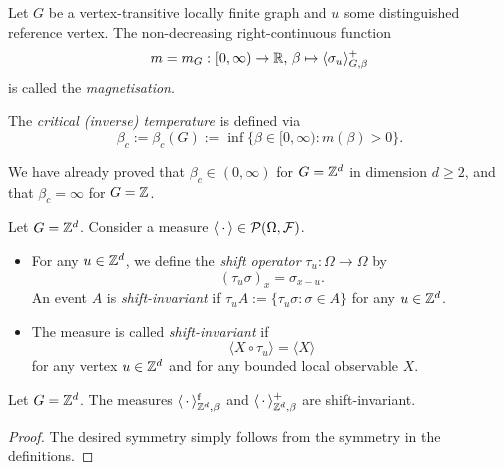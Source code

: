 \begin{definition}
    Let $G$ be a vertex-transitive locally finite graph and $u$ some distinguished reference vertex.
    The non-decreasing right-continuous function
    \[
        m=m_G:[0,\infty)\to\mathbb R,\,\beta\mapsto\langle\sigma_u\rangle_{G,\beta}^+
    \]
    is called the \emph{magnetisation}.

    The \emph{critical (inverse) temperature} is defined via
    \[
        \beta_c:=\beta_c(G):=\inf\{\beta\in[0,\infty):m(\beta)>0\}.
    \]
\end{definition}

We have already proved that $\beta_c\in(0,\infty)$ for $G=\mathbb Z^d$
in dimension $d\geq 2$,
and that $\beta_c=\infty$ for $G=\mathbb Z$.

\begin{definition}
    Let $G=\mathbb Z^d$.
    Consider a measure $\langle\,\cdot\,\rangle\in\mathcal P(\Omega,\mathcal F)$.
    \begin{itemize}
        \item For any $u\in\mathbb Z^d$, we define the \emph{shift operator} $\tau_u:\Omega\to\Omega$ by
        \[
            (\tau_u\sigma)_x = \sigma_{x-u}.
        \]
        An event $A$ is \emph{shift-invariant} if $\tau_uA:=\{\tau_u\sigma:\sigma\in A\}$ for any $u\in\mathbb Z^d$.
        \item The measure is called \emph{shift-invariant} if
        \[
            \langle X\circ\tau_u \rangle = \langle X\rangle
        \]
        for any vertex $u\in\mathbb Z^d$ and
        for any bounded local observable $X$.
    \end{itemize}
\end{definition}

\begin{theorem}
    Let $G=\mathbb Z^d$.
    The measures $\langle\,\cdot\,\rangle^{\operatorname{f}}_{\mathbb Z^d,\beta}$ and $\langle\,\cdot\,\rangle^+_{\mathbb Z^d,\beta}$
    are shift-invariant.
\end{theorem}

\begin{proof}
    The desired symmetry simply follows from the symmetry in the definitions.
\end{proof}

